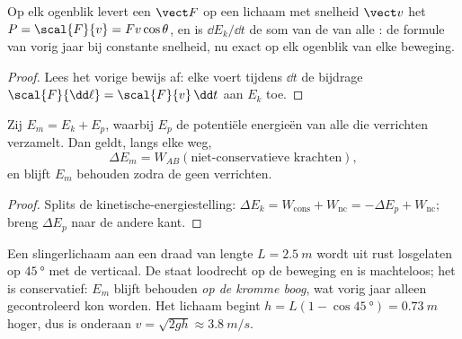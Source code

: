 \begin{proposition}\label{prop:g12:work-and-energy:power}
Op elk ogenblik levert een  $\vect F$ op een lichaam met snelheid
$\vect v$ het  $P = \scal{F}{v} = Fv\cos\theta$, en is
$\dd E_k/\dd t$ de som van de  van alle : de formule van
vorig jaar bij constante snelheid, nu exact op elk ogenblik van elke beweging.
\end{proposition}

\begin{proof}
Lees het vorige bewijs af: elke  voert tijdens $\dd t$ de bijdrage
$\scal{F}{\dd\ell} = \scal{F}{v}\,\dd t$ aan $E_k$ toe.
\end{proof}

\begin{theorem}\label{thm:g12:work-and-energy:emtheorem}
Zij $E_m = E_k + E_p$, waarbij $E_p$ de potentiële energieën van alle
 die  verrichten verzamelt. Dan geldt, langs elke
weg,
\[
\Delta E_m = W_{AB}(\text{niet-conservatieve krachten}),
\]
en blijft $E_m$ behouden zodra de  geen 
verrichten.
\end{theorem}

\begin{proof}
Splits de kinetische-energiestelling: $\Delta E_k = W_{\text{cons}} +
W_{\text{nc}} = -\Delta E_p + W_{\text{nc}}$; breng $\Delta E_p$ naar de
andere kant.
\end{proof}

\begin{example}\label{ex:g12:work-and-energy:pendulum}
Een slingerlichaam aan een draad van lengte $L = \qty{2.5}{m}$ wordt uit rust
losgelaten op $\qty{45}{\degree}$ met de verticaal. De  staat
loodrecht op de beweging en is machteloos; het  is conservatief:
$E_m$ blijft behouden \emph{op de kromme boog}, wat vorig jaar alleen
gecontroleerd kon worden. Het lichaam begint $h = L(1 -
\cos\qty{45}{\degree}) = \qty{0.73}{m}$ hoger, dus is onderaan
$v = \sqrt{2gh} \approx \qty{3.8}{m/s}$.
\end{example}

